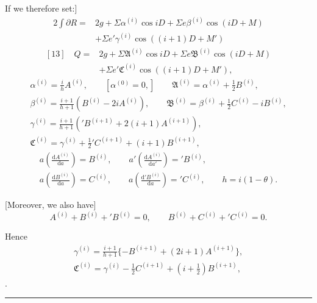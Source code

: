 If we therefore set:]
\[
\begin{aligned}
2\int\partial R={}&2g+\Sigma\alpha^{(i)}\cos iD+\Sigma e\beta^{(i)}\cos(iD+M)\\
&+\Sigma e'\gamma^{(i)}\cos((i+1)D+M')
\end{aligned}
\]
\[
\begin{aligned}
{}[13]\quad Q={}&2g+\Sigma\mathfrak{A}^{(i)}\cos iD+\Sigma e\mathfrak{B}^{(i)}\cos(iD+M)\\
&+\Sigma e'\mathfrak{C}^{(i)}\cos((i+1)D+M'),
\end{aligned}
\]
\[
\begin{gathered}
\alpha^{(i)}=\frac{i}{h}A^{(i)},\qquad[\alpha^{(0)}=0,]\qquad\mathfrak{A}^{(i)}=\alpha^{(i)}+\tfrac12 B^{(i)},\\[4pt]
\beta^{(i)}=\frac{i+1}{h+1}(B^{(i)}-2iA^{(i)}),\qquad\mathfrak{B}^{(i)}=\beta^{(i)}+\tfrac12 C^{(i)}-iB^{(i)},\\[4pt]
\gamma^{(i)}=\frac{i+1}{h+1}({}'B^{(i+1)}+2(i+1)A^{(i+1)}),\\
\mathfrak{C}^{(i)}=\gamma^{(i)}+\tfrac12{}'C^{(i+1)}+(i+1)B^{(i+1)},
\end{gathered}
\]
\[
\begin{gathered}
a\left(\frac{\mathrm{d}A^{(i)}}{\mathrm{d}a}\right)=B^{(i)},\qquad a'\left(\frac{\mathrm{d}A^{(i)}}{\mathrm{d}a'}\right)={}'B^{(i)},\\[4pt]
a\left(\frac{\mathrm{d}B^{(i)}}{\mathrm{d}a}\right)=C^{(i)},\qquad a\left(\frac{\mathrm{d}{}'B^{(i)}}{\mathrm{d}a}\right)={}'C^{(i)},\qquad h=i(1-\theta).
\end{gathered}
\]

[Moreover, we also have]
\[A^{(i)}+B^{(i)}+{}'B^{(i)}=0,\qquad B^{(i)}+C^{(i)}+{}'C^{(i)}=0.\]

Hence
\[
\begin{gathered}
\gamma^{(i)}=\frac{i+1}{h+1}\{-B^{(i+1)}+(2i+1)A^{(i+1)}\},\\
\mathfrak{C}^{(i)}=\gamma^{(i)}-\tfrac12 C^{(i+1)}+(i+\tfrac12)B^{(i+1)},
\end{gathered}
\]
.
\par\medskip\noindent\rule{\linewidth}{.4pt}

\endgroup
